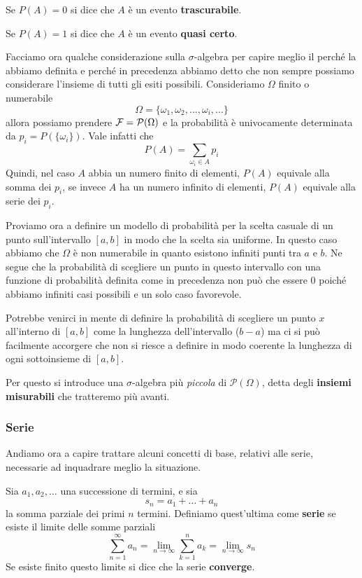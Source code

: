 \begin{definition}
	Se $P(A) = 0$ si dice che $A$ è un evento \textbf{trascurabile}.
\end{definition}

\begin{definition}
	Se $P(A) = 1$ si dice che $A$ è un evento \textbf{quasi certo}.
\end{definition}

Facciamo ora qualche considerazione sulla $\sigma$-algebra per capire meglio il perché la abbiamo
definita e perché in precedenza abbiamo detto che non sempre possiamo considerare l'insieme di
tutti gli esiti possibili. Consideriamo $\Omega$ finito o numerabile
\[ \Omega = \{ \omega_1, \omega_2, ..., \omega_i, ... \} \]
allora possiamo prendere $\mathcal{F} = \mathcal{P}(\Omega)$ e la probabilità è univocamente determinata
da $p_i = P(\{ \omega_i \})$. Vale infatti che
\[ P(A) = \sum_{\omega_i \in A} p_i \]
Quindi, nel caso $A$ abbia un numero finito di elementi, $P(A)$ equivale alla somma dei $p_i$, se
invece $A$ ha un numero infinito di elementi, $P(A)$ equivale alla serie dei $p_i$.

Proviamo ora a definire un modello di probabilità per la scelta casuale di un punto sull'intervallo
$[a,b]$ in modo che la scelta sia uniforme. In questo caso abbiamo che $\Omega$ è non
numerabile in quanto esistono infiniti punti tra $a$ e $b$. Ne segue che la probabilità di
scegliere un punto in questo intervallo con una funzione di probabilità definita come in
precedenza non può che essere 0 poiché abbiamo infiniti casi possibili e un solo caso favorevole.

Potrebbe venirci in mente di definire la probabilità di scegliere un punto $x$ all'interno di
$[a,b]$ come la lunghezza dell'intervallo ($b-a$) ma ci si può facilmente accorgere che non
si riesce a definire in modo coerente la lunghezza di ogni sottoinsieme di $[a,b]$.

Per questo si introduce una $\sigma$-algebra più \emph{piccola} di $\mathcal{P}(\Omega)$,
detta degli \textbf{insiemi misurabili} che tratteremo più avanti.

\subsubsection{Serie}
Andiamo ora a capire trattare alcuni concetti di base, relativi alle serie, necessarie ad
inquadrare meglio la situazione.

\begin{definition}
	Sia $a_1, a_2, \dots$ una successione di termini, e sia
	\[ s_n = a_1 + \dots + a_n \]
	la somma parziale dei primi $n$ termini. Definiamo quest'ultima come \textbf{serie} se esiste
	il limite delle somme parziali
	\[ \sum_{n=1}^\infty a_n = \lim_{n \to \infty} \sum_{k=1}^n a_k = \lim_{n \to \infty} s_n \]
	Se esiste finito questo limite si dice che la serie \textbf{converge}.
\end{definition}

